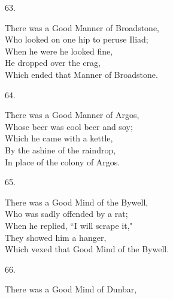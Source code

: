\documentclass{book}
\begin{document}
{\begin{center}
    63.
\end{center}
\par
\noindent
\hspace*{14mm}       There was a Good Manner of Broadstone, \\
\hspace*{14mm}       Who looked on one hip to peruse Iliad; \\
\hspace*{14mm}       When he were he looked fine, \\
\hspace*{14mm}       He dropped over the crag, \\
\hspace*{14mm}       Which ended that Manner of Broadstone.
\begin{center}
    64.
\end{center}
\par
\noindent
\hspace*{14mm}       There was a Good Manner of Argos, \\
\hspace*{14mm}       Whose beer was cool beer and soy; \\
\hspace*{14mm}       Which he came with a kettle, \\
\hspace*{14mm}       By the ashine of the raindrop, \\
\hspace*{14mm}       In place of the colony of Argos.
\begin{center}
    65.
\end{center}
\par
\noindent
\hspace*{14mm}       There was a Good Mind of the Bywell, \\
\hspace*{14mm}       Who was sadly offended by a rat; \\
\hspace*{14mm}       When he replied, ``I will scrape it," \\
\hspace*{14mm}       They showed him a hanger, \\
\hspace*{14mm}       Which vexed that Good Mind of the Bywell.
\begin{center}
    66.
\end{center}
\par
\noindent
\hspace*{14mm}       There was a Good Mind of Dunbar, \\
}
\end{document}
